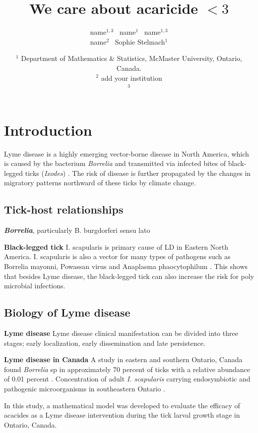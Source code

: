 \documentclass[12pt, centerh1]{article}
\title{We care about acaricide $<3$}
\author{\qquad name$^{1,3}$ \qquad\  name$^{1}$ \qquad\  name$^{1,3}$ \\  name$^{2}$ \quad\ Sophie Stelmach$^{1}$}
\date{{\small $^1$ Department of Mathematics \& Statistics, McMaster University, Ontario, Canada.\\[-6pt]
$^2$ add your institution\\[-6pt]
$^3$ \\[-6pt]
}
}
\begin{document}
\maketitle



\section{Introduction}
Lyme disease is a highly emerging vector-borne disease in North America, which is caused by the bacterium \textit{Borrelia} and transmitted via infected bites of black-legged ticks (\textit{Ixodes}) \citep{govcan}. The risk of disease is further propagated by the changes in migratory patterns northward of these ticks by climate change.

\subsection{Tick-host relationships}
\textbf{\textit{Borrelia}}, particularly B. burgdorferi sensu lato

\textbf{Black-legged tick}
I. scapularis is primary cause of LD in Eastern North America. I. scapularis is also a vector for many types of pathogens such as Borrelia mayonni, Powassan virus and Anaplasma phaocytophilum \citep{paulson2023multiomics}. This shows that besides Lyme disease, the black-legged tick can also increase the risk for poly microbial infections. 

\subsection{Biology of Lyme disease}

\textbf{Lyme disease}
Lyme disease clinical manifestation can be divided into three stages; early localization, early dissemination and late persistence. 

\textbf{Lyme disease in Canada}
A study in eastern and southern Ontario, Canada found \textit{Borrelia} sp in approximately 70 percent of ticks with a relative abundance of 0.01 percent \citep{clow2018microbiota}. Concentration of adult \textit{I. scapularis} carrying endosymbiotic and pathogenic microorganisms in southeastern Ontario \citep{paulson2023multiomics}. 

In this study, a mathematical model was developed to evaluate the efficacy of acacides as a Lyme disease intervention during the tick larval growth stage in Ontario, Canada.
\end{document}
